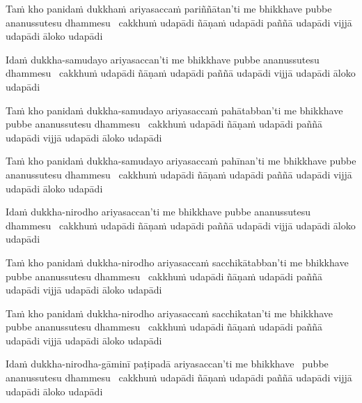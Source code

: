 \begin{pali-hang}
  Taṁ kho panidaṁ dukkhaṁ ariyasaccaṁ pariññātan'ti me bhikkhave pubbe ananussutesu dhammesu \breathmark\ cakkhuṁ udapādi ñāṇaṁ udapādi paññā udapādi vijjā udapādi āloko udapādi
\end{pali-hang}

\ifninebythirteen\clearpage\fi

\begin{pali-hang}
  Idaṁ dukkha-samudayo ariyasaccan'ti me bhikkhave pubbe ananussutesu dhammesu \breathmark\ cakkhuṁ udapādi ñāṇaṁ udapādi paññā udapādi vijjā udapādi āloko udapādi
\end{pali-hang}

\begin{pali-hang}
  Taṁ kho panidaṁ dukkha-samudayo ariyasaccaṁ pahātabban'ti me bhikkhave pubbe ananussutesu dhammesu \breathmark\ cakkhuṁ udapādi ñāṇaṁ udapādi paññā udapādi vijjā udapādi āloko udapādi
\end{pali-hang}

\begin{pali-hang}
  Taṁ kho panidaṁ dukkha-samudayo ariyasaccaṁ pahīnan'ti me bhikkhave pubbe ananussutesu dhammesu \breathmark\ cakkhuṁ udapādi ñāṇaṁ udapādi paññā udapādi vijjā udapādi āloko udapādi
\end{pali-hang}

\begin{pali-hang}
  Idaṁ dukkha-nirodho ariyasaccan'ti me bhikkhave pubbe ananussutesu dhammesu \breathmark\ cakkhuṁ udapādi ñāṇaṁ udapādi paññā udapādi vijjā udapādi āloko udapādi
\end{pali-hang}

\begin{pali-hang}
  Taṁ kho panidaṁ dukkha-nirodho ariyasaccaṁ sacchikātabban'ti me bhikkhave pubbe ananussutesu dhammesu \breathmark\ cakkhuṁ udapādi ñāṇaṁ udapādi paññā udapādi vijjā udapādi āloko udapādi
\end{pali-hang}

\ifninebythirteen\clearpage\fi

\begin{pali-hang}
  Taṁ kho panidaṁ dukkha-nirodho ariyasaccaṁ sacchikatan'ti me bhikkhave pubbe ananussutesu dhammesu \breathmark\ cakkhuṁ udapādi ñāṇaṁ udapādi paññā udapādi vijjā udapādi āloko udapādi
\end{pali-hang}

\begin{pali-hang}
  Idaṁ dukkha-nirodha-gāminī paṭipadā ariyasaccan'ti me \mbox{bhikkhave}~ pubbe ananussutesu dhammesu \breathmark\ cakkhuṁ udapādi ñāṇaṁ udapādi paññā udapādi vijjā udapādi āloko udapādi
\end{pali-hang}

